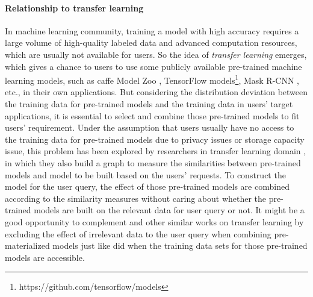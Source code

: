 \paragraph{Relationship to transfer learning} In machine learning community, training a model with high accuracy requires a large volume of high-quality labeled data and advanced computation resources, which are usually not available for users.  So the idea of {\em transfer learning} emerges, which gives a chance to users to use some publicly available pre-trained machine learning models, such as caffe Model Zoo \cite{jia2015caffe}, TensorFlow models\footnote{https://github.com/tensorflow/models}, Mask R-CNN \cite{matterport_maskrcnn_2017}, etc., in their own applications. But considering the distribution deviation between the training data for pre-trained models and the training data in users' target applications, it is essential to select and combine those pre-trained models to fit users' requirement. Under the assumption that users usually have no access to the training data for pre-trained models due to privacy issues or storage capacity issue, this problem has been explored by researchers in transfer learning domain \cite{eaton2008modeling}, in which they also build a graph to measure the similarities between pre-trained models and model to be built based on the users' requests. To construct the model for the user query, the effect of those pre-trained models are combined according to the similarity measures  without caring about whether the pre-trained models are built on the relevant data for user query or not. It might be a good opportunity to complement \cite{eaton2008modeling} and other similar works on transfer learning by excluding the effect of irrelevant data to the user query when combining pre-materialized models just like \cite{gupta2015processing} did when the training data sets for those pre-trained models are accessible.

